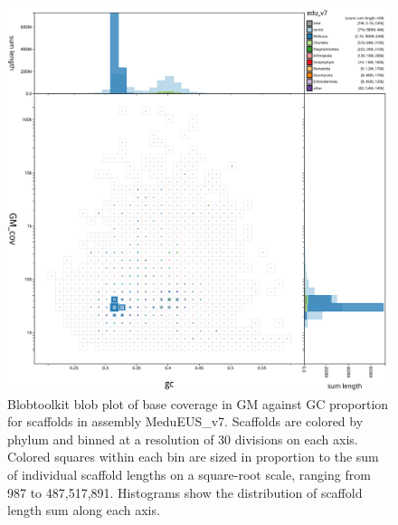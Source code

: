 \documentclass[11pt, a4paper]{article}
\begin{document}
\begin{figure}
	\includegraphics[width=\linewidth]{figures/btk_blob_MeduEUS_v7}
	\caption{Blobtoolkit blob plot of base coverage in GM against GC proportion for scaffolds in assembly MeduEUS\_v7. Scaffolds are colored by phylum and binned at a resolution of 30 divisions on each axis. Colored squares within each bin are sized in proportion to the sum of individual scaffold lengths on a square-root scale, ranging from 987 to 487,517,891. Histograms show the distribution of scaffold length sum along each axis.}
	\label{supfig:btk-blob-MeduEUS}
\end{figure}
\end{document}
